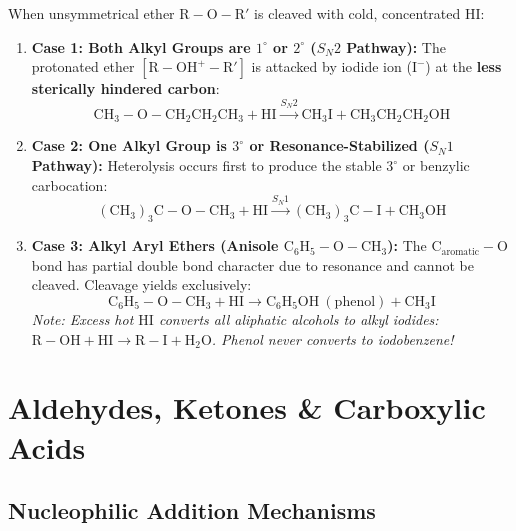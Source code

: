 \documentclass[10pt,twoside,openright]{book}
\begin{document}
\begin{formulabox}
When unsymmetrical ether $\mathrm{R-O-R'}$ is cleaved with cold, concentrated $\mathrm{HI}$:
\begin{enumerate}[leftmargin=*]
  \item \textbf{Case 1: Both Alkyl Groups are $1^\circ$ or $2^\circ$ ($S_N2$ Pathway):}
  The protonated ether $[\mathrm{R-OH^+-R'}]$ is attacked by iodide ion ($\mathrm{I^-}$) at the \textbf{less sterically hindered carbon}:
  \begin{equation}
    \mathrm{CH_3-O-CH_2CH_2CH_3} + \mathrm{HI} \xrightarrow{S_N2} \mathbf{\mathrm{CH_3I}} + \mathrm{CH_3CH_2CH_2OH}
  \end{equation}
  \item \textbf{Case 2: One Alkyl Group is $3^\circ$ or Resonance-Stabilized ($S_N1$ Pathway):}
  Heterolysis occurs first to produce the stable $3^\circ$ or benzylic carbocation:
  \begin{equation}
    \mathrm{(CH_3)_3C-O-CH_3} + \mathrm{HI} \xrightarrow{S_N1} \mathbf{\mathrm{(CH_3)_3C-I}} + \mathrm{CH_3OH}
  \end{equation}
  \item \textbf{Case 3: Alkyl Aryl Ethers (Anisole $\mathrm{C_6H_5-O-CH_3}$):}
  The $\mathrm{C_{aromatic}-O}$ bond has partial double bond character due to resonance and cannot be cleaved. Cleavage yields exclusively:
  \begin{equation}
    \mathrm{C_6H_5-O-CH_3} + \mathrm{HI} \longrightarrow \mathbf{\mathrm{C_6H_5OH}} \ (\text{phenol}) + \mathbf{\mathrm{CH_3I}}
  \end{equation}
  \textit{Note: Excess hot $\mathrm{HI}$ converts all aliphatic alcohols to alkyl iodides: $\mathrm{R-OH} + \mathrm{HI} \to \mathrm{R-I} + \mathrm{H_2O}$. Phenol never converts to iodobenzene!}
\end{enumerate}
\end{formulabox}

\section{Aldehydes, Ketones \& Carboxylic Acids}

\subsection{Nucleophilic Addition Mechanisms}
\end{document}
